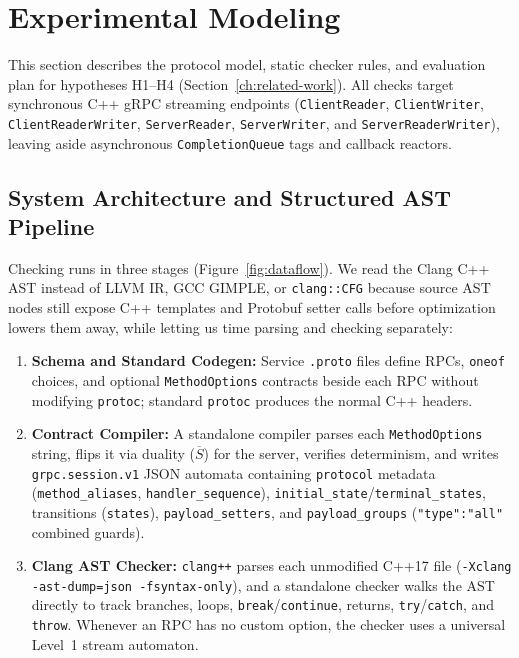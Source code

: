 \section{Experimental Modeling}
\label{ch:experimental-modeling}

This section describes the protocol model, static checker rules, and evaluation plan for hypotheses H1--H4 (Section~\ref{ch:related-work}). All checks target synchronous C++ gRPC streaming endpoints (\texttt{ClientReader}, \texttt{ClientWriter}, \texttt{ClientReaderWriter}, \texttt{ServerReader}, \texttt{ServerWriter}, and \texttt{ServerReaderWriter}), leaving aside asynchronous \texttt{CompletionQueue} tags and callback reactors.

\subsection{System Architecture and Structured AST Pipeline}
\label{sec:exp-architecture}

Checking runs in three stages (Figure~\ref{fig:dataflow}). We read the Clang C++ AST instead of LLVM IR, GCC GIMPLE, or \texttt{clang::CFG} because source AST nodes still expose C++ templates and Protobuf setter calls before optimization lowers them away, while letting us time parsing and checking separately:
\begin{enumerate}
    \item \textbf{Schema and Standard Codegen:} Service \texttt{.proto} files define RPCs, \texttt{oneof} choices, and optional \texttt{MethodOptions} contracts beside each RPC without modifying \texttt{protoc}; standard \texttt{protoc} produces the normal C++ headers.
    \item \textbf{Contract Compiler:} A standalone compiler parses each \texttt{MethodOptions} string, flips it via duality ($\overline{S}$) for the server, verifies determinism, and writes \texttt{grpc.session.v1} JSON automata containing \texttt{protocol} metadata (\texttt{method\_aliases}, \texttt{handler\_sequence}), \texttt{initial\_state}/\texttt{terminal\_states}, transitions (\texttt{states}), \texttt{payload\_setters}, and \texttt{payload\_groups} (\texttt{"type":"all"} combined guards).
    \item \textbf{Clang AST Checker:} \texttt{clang++} parses each unmodified C++17 file (\texttt{-Xclang -ast-dump=json -fsyntax-only}), and a standalone checker walks the AST directly to track branches, loops, \texttt{break}/\texttt{continue}, returns, \texttt{try}/\texttt{catch}, and \texttt{throw}. Whenever an RPC has no custom option, the checker uses a universal Level~1 stream automaton.
\end{enumerate}

